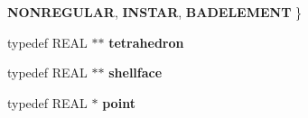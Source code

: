 \begin{DoxyCompactItemize}
{\bfseries N\+O\+N\+R\+E\+G\+U\+L\+AR}, 
{\bfseries I\+N\+S\+T\+AR}, 
\newline
{\bfseries B\+A\+D\+E\+L\+E\+M\+E\+NT}
 \}
\item 
\mbox{\label{classtetgenmesh_a6a12b1c0d1834ca941d16c62e949e5e3}} 
typedef R\+E\+AL $\ast$$\ast$ {\bfseries tetrahedron}
\item 
\mbox{\label{classtetgenmesh_ad4860123b88783b943fa6452e886a2cb}} 
typedef R\+E\+AL $\ast$$\ast$ {\bfseries shellface}
\item 
\mbox{\label{classtetgenmesh_ace3fb4f80389185b7c9b18ab69a3dea2}} 
typedef R\+E\+AL $\ast$ {\bfseries point}
\end{DoxyCompactItemize}

